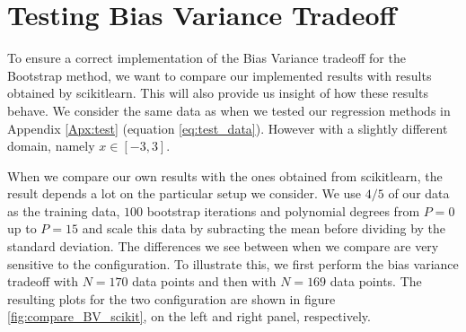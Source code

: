\documentclass[reprint,english,notitlepage,aps,nobalancelastpage,nofootinbib]{revtex4-1}  %
\begin{document}
\section{Testing Bias Variance Tradeoff}\label{Apx:testing_BVT}
To ensure a correct implementation of the Bias Variance tradeoff for the Bootstrap method, we want to compare our implemented results with results obtained by scikitlearn. This will also provide us insight of how these results behave. We consider the same data as when we tested our regression methods in Appendix \ref{Apx:test} (equation \eqref{eq:test_data}). However with a slightly different domain, namely $x\in[-3,3]$.

When we compare our own results with the ones obtained from scikitlearn, the result depends a lot on the particular setup we consider. We use $4/5$ of our data as the training data, $100$ bootstrap iterations and polynomial degrees from $P=0$ up to $P=15$ and scale this data by subracting the mean before dividing by the standard deviation. The differences we see between when we compare are very sensitive to the configuration. To illustrate this, we first perform the bias variance tradeoff with $N=170$ data points and then with $N=169$ data points. The resulting plots for the two configuration are shown in figure \ref{fig:compare_BV_scikit}, on the left and right panel, respectively.
\end{document}

